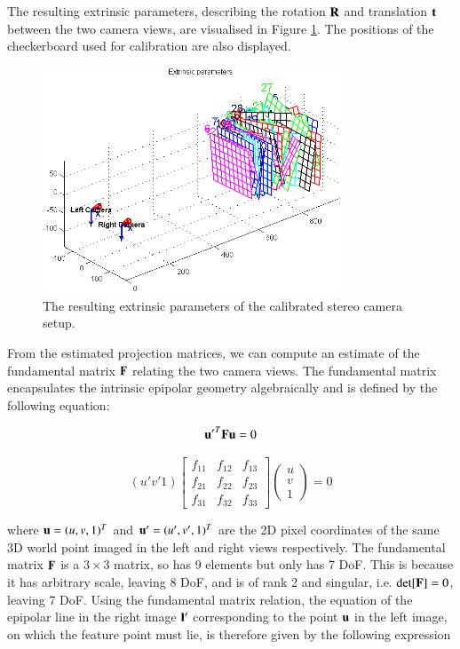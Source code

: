 The resulting extrinsic parameters, describing the rotation $\mathbf{R}$ and translation $\mathbf{t}$ between the two camera views, are visualised in Figure \ref{fig:calib}. The positions of the checkerboard used for calibration are also displayed.

\begin{figure}[htbp!]
\centering
\includegraphics[width=0.8\textwidth]{img/calib}
	\caption{The resulting extrinsic parameters of the calibrated stereo camera setup.}
	\label{fig:calib}
\end{figure}

From the estimated projection matrices, we can compute an estimate of the fundamental matrix $\mathbf{F}$ relating the two camera views. The fundamental matrix encapsulates the intrinsic epipolar geometry algebraically and is defined by the following equation:

\begin{equation*}
\mathbf{u'}^T \mathbf{Fu} = 0
\end{equation*}

\begin{equation*}
(u' v' 1)
    \begin{bmatrix}
    f_{11} & f_{12} & f_{13} \\
    f_{21} & f_{22} & f_{23} \\
    f_{31} & f_{32} & f_{33}
    \end{bmatrix}
    \left(\!
    \begin{array}{c}
     u \\
  	 v \\
   	 1  
    \end{array}
    \!\right) = 0
\end{equation*}

where $\mathbf{u} = (u,v,1)^T$ and $\mathbf{u}'= (u',v',1)^T$ are the 2D pixel coordinates of the same 3D world point imaged in the left and right views respectively. The fundamental matrix $\mathbf{F}$ is a $3 \times 3$ matrix, so has 9 elements but only has 7 DoF. This is because it has arbitrary scale, leaving 8 DoF, and is of rank 2 and singular, i.e. $\mathrm{det} [\mathbf{F}] = 0$, leaving 7 DoF. Using the fundamental matrix relation, the equation of the epipolar line in the right image $\mathbf{l}'$ corresponding to the point $\mathbf{u}$ in the left image, on which the feature point must lie, is therefore given by the following expression

